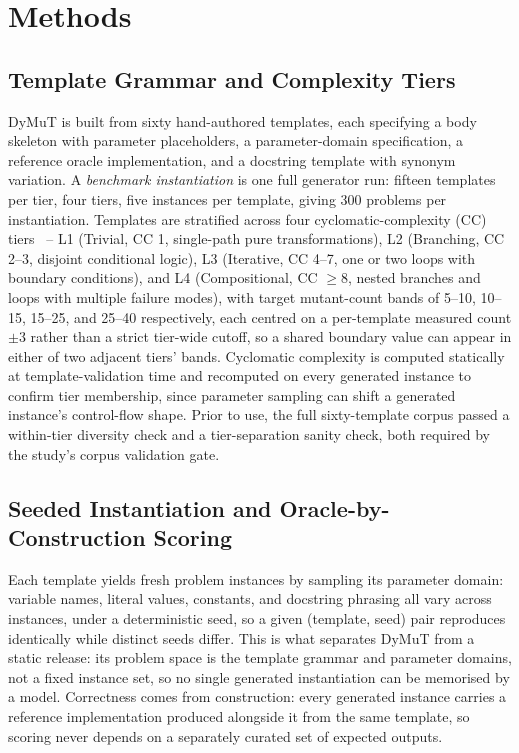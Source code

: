 \section{Methods}
\label{sec:methods}

\subsection{Template Grammar and Complexity Tiers}
\label{sec:methods-templates}
DyMuT is built from sixty hand-authored templates, each specifying a body skeleton with parameter placeholders, a parameter-domain specification, a reference oracle implementation, and a docstring template with synonym variation. A \emph{benchmark instantiation} is one full generator run: fifteen templates per tier, four tiers, five instances per template, giving 300 problems per instantiation. Templates are stratified across four cyclomatic-complexity (CC) tiers~\cite{mccabe1976complexity} -- L1 (Trivial, CC 1, single-path pure transformations), L2 (Branching, CC 2--3, disjoint conditional logic), L3 (Iterative, CC 4--7, one or two loops with boundary conditions), and L4 (Compositional, CC ${\geq}8$, nested branches and loops with multiple failure modes), with target mutant-count bands of 5--10, 10--15, 15--25, and 25--40 respectively, each centred on a per-template measured count $\pm3$ rather than a strict tier-wide cutoff, so a shared boundary value can appear in either of two adjacent tiers' bands. Cyclomatic complexity is computed statically at template-validation time and recomputed on every generated instance to confirm tier membership, since parameter sampling can shift a generated instance's control-flow shape. Prior to use, the full sixty-template corpus passed a within-tier diversity check and a tier-separation sanity check, both required by the study's corpus validation gate.

\subsection{Seeded Instantiation and Oracle-by-Construction Scoring}
\label{sec:methods-instantiation}
Each template yields fresh problem instances by sampling its parameter domain: variable names, literal values, constants, and docstring phrasing all vary across instances, under a deterministic seed, so a given (template, seed) pair reproduces identically while distinct seeds differ. This is what separates DyMuT from a static release: its problem space is the template grammar and parameter domains, not a fixed instance set, so no single generated instantiation can be memorised by a model. Correctness comes from construction: every generated instance carries a reference implementation produced alongside it from the same template, so scoring never depends on a separately curated set of expected outputs.

